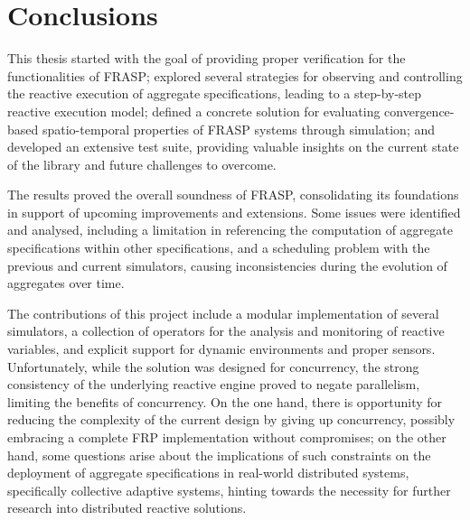 
\chapter{Conclusions}
\label{chapter:conclusions}

This thesis started with the goal of providing proper verification for the
functionalities of FRASP; explored several strategies for observing and
controlling the reactive execution of aggregate specifications, leading to a
step-by-step reactive execution model; defined a concrete solution for
evaluating convergence-based spatio-temporal properties of FRASP systems
through simulation; and developed an extensive test suite, providing valuable
insights on the current state of the library and future challenges to overcome.

The results proved the overall soundness of FRASP, consolidating its
foundations in support of upcoming improvements and extensions. Some issues
were identified and analysed, including a limitation in referencing the
computation of aggregate specifications within other specifications, and a
scheduling problem with the previous and current simulators, causing
inconsistencies during the evolution of aggregates over time.

The contributions of this project include a modular implementation of several
simulators, a collection of operators for the analysis and monitoring of
reactive variables, and explicit support for dynamic environments and proper
sensors. Unfortunately, while the solution was designed for concurrency, the
strong consistency of the underlying reactive engine proved to negate
parallelism, limiting the benefits of concurrency. On the one hand, there is
opportunity for reducing the complexity of the current design by giving up
concurrency, possibly embracing a complete \ac{FRP} implementation without
compromises; on the other hand, some questions arise about the implications of
such constraints on the deployment of aggregate specifications in real-world
distributed systems, specifically collective adaptive systems, hinting towards
the necessity for further research into distributed reactive solutions.
